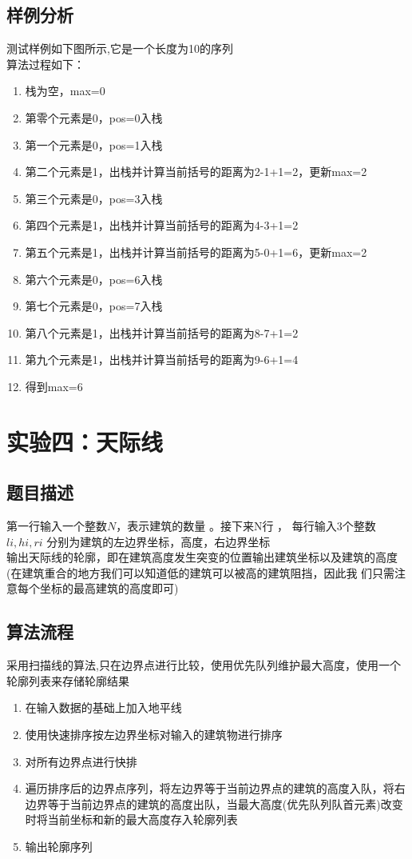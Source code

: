 \documentclass[UTF8,a4paperdui, %
]{ctexart}
\begin{document}
\subsection{样例分析}
测试样例如下图所示,它是一个长度为10的序列
\\
算法过程如下：
\begin{enumerate}
    \item 栈为空，max=0
    \item 第零个元素是0，pos=0入栈
    \item 第一个元素是0，pos=1入栈
    \item 第二个元素是1，出栈并计算当前括号的距离为2-1+1=2，更新max=2
    \item 第三个元素是0，pos=3入栈
    \item 第四个元素是1，出栈并计算当前括号的距离为4-3+1=2
    \item 第五个元素是1，出栈并计算当前括号的距离为5-0+1=6，更新max=2
    \item 第六个元素是0，pos=6入栈
    \item 第七个元素是0，pos=7入栈
    \item 第八个元素是1，出栈并计算当前括号的距离为8-7+1=2
    \item 第九个元素是1，出栈并计算当前括号的距离为9-6+1=4
    \item 得到max=6
\end{enumerate}

\newpage
\section{实验四：天际线}
\subsection{题目描述}
第一行输入一个整数$N$，表示建筑的数量 。接下来N行 ， 每行输入3个整数$li ,hi ,ri$ 分别为建筑的左边界坐标，高度，右边界坐标\\
输出天际线的轮廓，即在建筑高度发生突变的位置输出建筑坐标以及建筑的高度(在建筑重合的地方我们可以知道低的建筑可以被高的建筑阻挡，因此我
们只需注意每个坐标的最高建筑的高度即可)

\subsection{算法流程}
采用扫描线的算法,只在边界点进行比较，使用优先队列维护最大高度，使用一个轮廓列表来存储轮廓结果
\begin{enumerate}
    \item 在输入数据的基础上加入地平线
    \item 使用快速排序按左边界坐标对输入的建筑物进行排序
    \item 对所有边界点进行快排
    \item 遍历排序后的边界点序列，将左边界等于当前边界点的建筑的高度入队，将右边界等于当前边界点的建筑的高度出队，当最大高度(优先队列队首元素)改变时将当前坐标和新的最大高度存入轮廓列表
    \item 输出轮廓序列
\end{enumerate}
\end{document}
